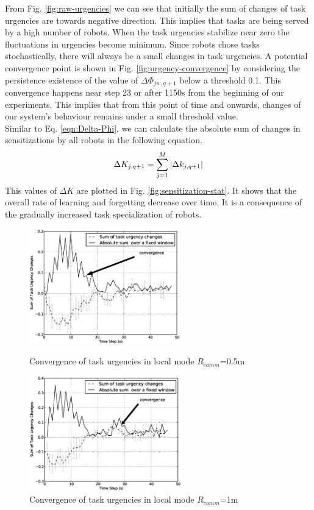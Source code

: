 \documentclass[letterpaper, 10 pt, conference]{ieeeconf}  %
\begin{document}
From Fig. \ref{fig:raw-urgencies} we can see that initially the sum of changes of task urgencies are towards negative direction. This implies that tasks are being served by a high number of robots. When the task urgencies stabilize near zero the fluctuations in urgencies become minimum. Since robots chose tasks stochastically, there will always be a small changes in task urgencies. A potential convergence point is shown in Fig. \ref{fig:urgency-convergence} by considering the persistence existence of the value of $\Delta \Phi_{jw, q+1}$ below a threshold 0.1. This convergence happens near step 23 or after 1150s from the beginning of our experiments. This implies that from this point of time and onwards, changes of our system's behaviour remains under a small threshold value.\\
%
Similar to Eq. \ref{eqn:Delta-Phi}, we can calculate the absolute sum of changes in sensitizations by all robots in the following equation.
% 
\begin{equation}
\small 
\Delta K_{j, q+1} = \sum_{j=1}^{M} \left | \Delta k_{j, q+1} \right |
\label{eqn:Delta-K}
\end{equation}
This values of $\Delta K$ are plotted in Fig. \ref{fig:sensitization-stat}. It shows that the overall rate of learning and forgetting decrease over time. It is a consequence of the gradually increased task specialization of robots.
\begin{figure}
\begin{minipage}[t]{0.5\linewidth}
\centering
\includegraphics[height=5cm, angle=0]
{images/local-500cm/Local500cm-TaskUrgencyConvergence.eps}
\caption{\small Convergence of task urgencies in local mode $R_{comm}$=0.5m}
\label{fig:l500cm-convergence} %
\end{minipage}
\hspace{0.5cm}
\begin{minipage}[t]{0.5\linewidth}
\centering
\includegraphics[height=5cm, angle=0]{images/local-1m/TaskUrgencyConvergence.eps}
\caption{\small Convergence of task urgencies in local mode $R_{comm}$=1m}
\label{fig:l1m-convergence} %
\end{minipage}
\end{figure}
\end{document}
